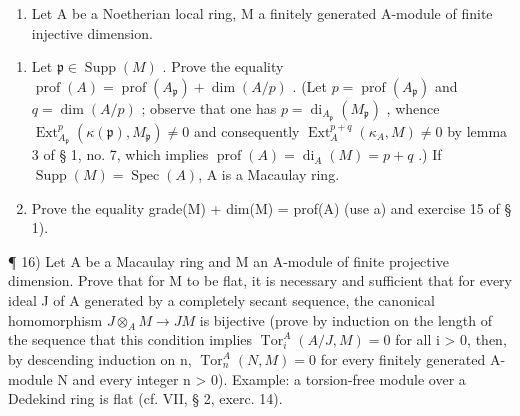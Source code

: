 \begin{enumerate}
\def\labelenumi{\arabic{enumi})}
\setcounter{enumi}{14}
\tightlist
\item
  Let A be a Noetherian local ring, M a finitely generated A-module of finite injective dimension.
\end{enumerate}

\begin{enumerate}
\def\labelenumi{\alph{enumi})}
\item
  Let \(\mathfrak{p} \in \operatorname{Supp}(M)\) . Prove the equality \(\operatorname{prof}(A) = \operatorname{prof}(A_{\mathfrak{p}}) + \dim(A/p)\) . (Let \(p = \operatorname{prof}(A_{\mathfrak{p}})\) and \(q = \dim(A/p)\) ; observe that one has \(p = \operatorname{di}_{A_{\mathfrak{p}}} (M_{\mathfrak{p}})\) , whence \(\operatorname{Ext}_{A_{\mathfrak{p}}}^{p}(\kappa(\mathfrak{p}), M_{\mathfrak{p}}) \neq 0\) and consequently \(\operatorname{Ext}_{A}^{p+q}(\kappa_A, M) \neq 0\) by lemma 3 of § 1, no. 7, which implies \(\operatorname{prof}(A) = \operatorname{di}_A(M) = p + q\) .) If \(\operatorname{Supp}(M) = \operatorname{Spec}(A)\), A is a Macaulay ring.
\item
  Prove the equality grade(M) + dim(M) = prof(A) (use a) and exercise 15 of § 1).
\end{enumerate}

¶ 16) Let A be a Macaulay ring and M an A-module of finite projective dimension. Prove that for M to be flat, it is necessary and sufficient that for every ideal J of A generated by a completely secant sequence, the canonical homomorphism \(J \otimes_{A} M \to JM\) is bijective (prove by induction on the length of the sequence that this condition implies \(\operatorname{Tor}_{i}^{A}(A/J, M) = 0\) for all i \textgreater{} 0, then, by descending induction on n, \(\operatorname{Tor}_{n}^{A}(N, M) = 0\) for every finitely generated A-module N and every integer n \textgreater{} 0). Example: a torsion-free module over a Dedekind ring is flat (cf. VII, § 2, exerc. 14).
\relax{}
